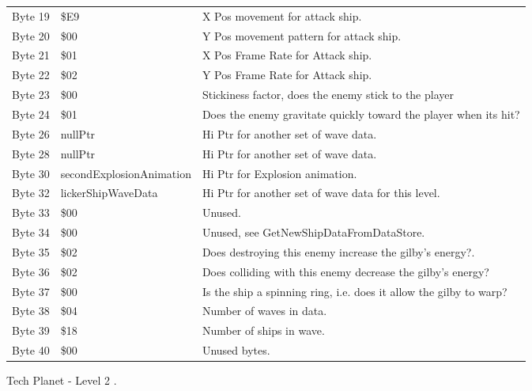\begin{figure}[H]
{\begin{adjustbox}{width=12cm}
\begin{tabular}{lll}
 Byte 19 & \$E9                      & X Pos movement for attack ship.                                    \\
 Byte 20 & \$00                      & Y Pos movement pattern for attack ship.                            \\
 Byte 21 & \$01                      & X Pos Frame Rate for Attack ship.                                  \\
 Byte 22 & \$02                      & Y Pos Frame Rate for Attack ship.                                  \\
 Byte 23 & \$00                      & Stickiness factor, does the enemy stick to the player              \\
 Byte 24 & \$01                      & Does the enemy gravitate quickly toward the player when its hit?   \\
 Byte 26 & nullPtr                  & Hi Ptr for another set of wave data.                               \\
 Byte 28 & nullPtr                  & Hi Ptr for another set of wave data.                               \\
 Byte 30 & secondExplosionAnimation & Hi Ptr for Explosion animation.                                    \\
 Byte 32 & lickerShipWaveData       & Hi Ptr for another set of wave data for this level.                \\
 Byte 33 & \$00                      & Unused.                                                            \\
 Byte 34 & \$00                      & Unused, see GetNewShipDataFromDataStore.                           \\
 Byte 35 & \$02                      & Does destroying this enemy increase the gilby's energy?.           \\
 Byte 36 & \$02                      & Does colliding with this enemy decrease the gilby's energy?        \\
 Byte 37 & \$00                      & Is the ship a spinning ring, i.e. does it allow the gilby to warp? \\
 Byte 38 & \$04                      & Number of waves in data.                                           \\
 Byte 39 & \$18                      & Number of ships in wave.                                           \\
 Byte 40 & \$00                      & Unused bytes.                                                      \\
\bottomrule
\end{tabular}

  \end{adjustbox}

  }\caption*{Tech Planet - Level 2
.}
\end{figure}

